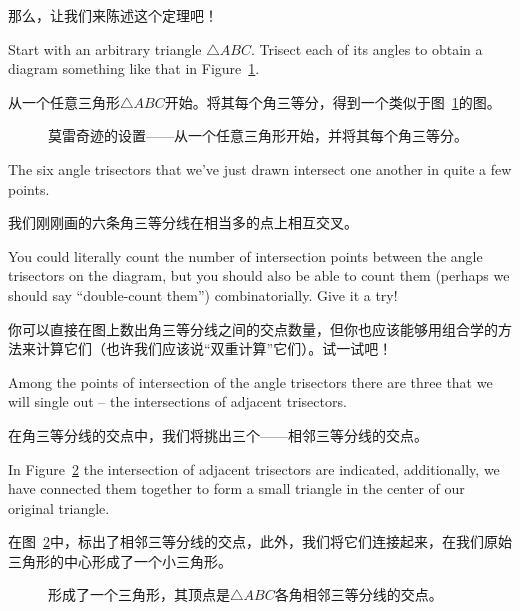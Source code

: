那么，让我们来陈述这个定理吧！

Start with an arbitrary triangle ${\triangle}ABC$.  Trisect each of its angles
to obtain a diagram something like that in Figure~\ref{fig:morley_setup}.

从一个任意三角形${\triangle}ABC$开始。将其每个角三等分，得到一个类似于图~\ref{fig:morley_setup}的图。

\begin{figure}[!hbtp] 
\begin{center}

\end{center}
\caption[The setup for Morley's Miracle.]{The setup for Morley's %
Miracle -- start with an arbitrary triangle and trisect each of %
its angles.}
\caption[莫雷奇迹的设置。]{莫雷奇迹的设置——从一个任意三角形开始，并将其每个角三等分。}
\label{fig:morley_setup}
\end{figure}
 
The six angle trisectors that we've just drawn intersect one another
in quite a few points.

我们刚刚画的六条角三等分线在相当多的点上相互交叉。

\begin{exer}
You could literally count the number of intersection points between the
angle trisectors on the diagram, but you should also be able to count them
(perhaps we should say ``double-count them'') combinatorially.
Give it 
a try!
\end{exer}

\begin{exer}
你可以直接在图上数出角三等分线之间的交点数量，但你也应该能够用组合学的方法来计算它们（也许我们应该说“双重计算”它们）。试一试吧！
\end{exer}

Among the points of intersection of the angle trisectors there are three
that we will single out -- the intersections of adjacent trisectors.

在角三等分线的交点中，我们将挑出三个——相邻三等分线的交点。

In Figure~\ref{fig:morley_1st_triangle} the intersection of adjacent trisectors
are indicated, additionally, we have connected them together to form a 
small triangle in the center of our original triangle.

在图~\ref{fig:morley_1st_triangle}中，标出了相邻三等分线的交点，此外，我们将它们连接起来，在我们原始三角形的中心形成了一个小三角形。

\clearpage

\begin{figure}[!hbtp] 
\begin{center}

\end{center}
\caption[The first Morley triangle.]{A triangle is formed whose vertices %
are the intersections of the adjacent trisectors of the angles of %
${\triangle}ABC$.}
\caption[第一个莫雷三角形。]{形成了一个三角形，其顶点是${\triangle}ABC$各角相邻三等分线的交点。}
\label{fig:morley_1st_triangle}
\end{figure}
  


